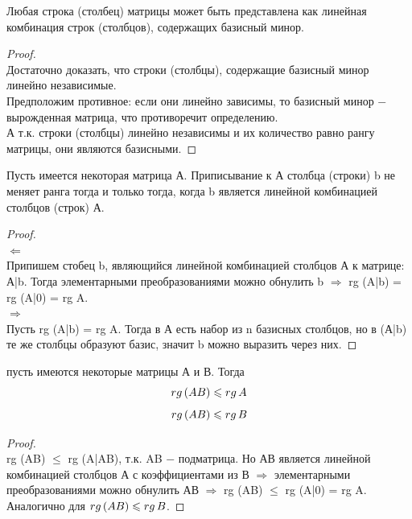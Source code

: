 \begin{theorem}
    Любая строка (столбец) матрицы может быть представлена как линейная комбинация строк (столбцов), содержащих базисный минор.
\end{theorem}
\begin{proof}
    \tab\\

        Достаточно доказать, что строки (столбцы), содержащие базисный минор линейно независимые.\\

        Предположим противное: если они линейно зависимы, то базисный минор $-$ вырожденная матрица, что противоречит определению.\\

        А т.к. строки (столбцы) линейно независимы и их количество равно рангу матрицы, они являются базисными.
\end{proof}

\begin{theorem}
    Пусть имеется некоторая матрица А. Приписывание к А столбца (строки) b не меняет ранга тогда и только тогда, когда b является линейной комбинацией столбцов (строк) А.
\end{theorem}
\begin{proof}
    \tab\\

    $\Longleftarrow$\\

    Припишем стобец b, являющийся линейной комбинацией столбцов А к матрице: А|b. Тогда элементарными преобразованиями можно обнулить b $\Longrightarrow$ rg (A|b) = rg (A|0) = rg A.\\

    $\Longrightarrow$\\

    Пусть rg (A|b) = rg A. Тогда в А есть набор из n базисных столбцов, но в (А|b) те же столбцы образуют базис, значит b можно выразить через них.
\end{proof}

\begin{theorem}
    пусть имеются некоторые матрицы А и В. Тогда
    \[
    rg\thinspace (AB) \leq rg\thinspace A
    \]
    \[
    rg\thinspace (AB) \leq rg\thinspace B
    \]
\end{theorem}
\begin{proof}
    \tab\\

    rg (AB) $\leq$ rg (A|AB), т.к. AB $-$ подматрица. Но АВ является линейной комбинацией столбцов А с коэффициентами из В $\Longrightarrow$ элементарными преобразованиями можно обнулить АВ $\Longrightarrow$ rg (AB) $\leq$ rg (A|0) = rg A.\\

    Аналогично для $rg\thinspace (AB) \leq rg\thinspace B$.
\end{proof}

